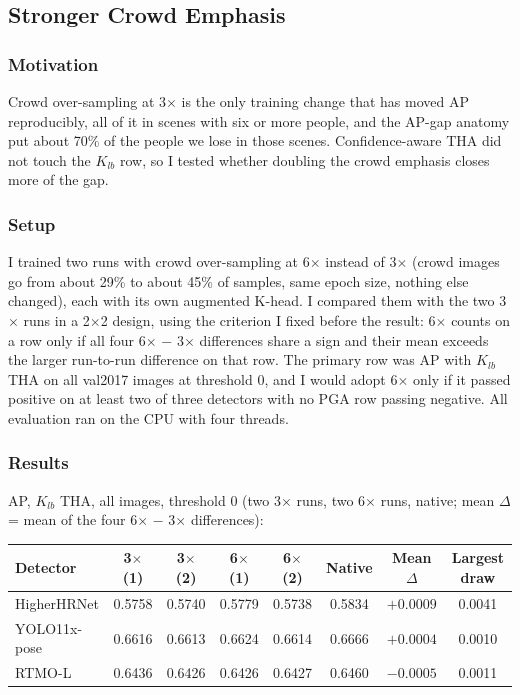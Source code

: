 \subsection{Stronger Crowd Emphasis}

\subsubsection{Motivation}

Crowd over-sampling at 3$\times$ is the only training change that has moved AP reproducibly, all of it in scenes with six or more people, and the AP-gap anatomy put about 70\% of the people we lose in those scenes.
Confidence-aware THA did not touch the $K_{lb}$ row, so I tested whether doubling the crowd emphasis closes more of the gap.

\subsubsection{Setup}

I trained two runs with crowd over-sampling at 6$\times$ instead of 3$\times$ (crowd images go from about 29\% to about 45\% of samples, same epoch size, nothing else changed), each with its own augmented K-head.
I compared them with the two 3$\times$ runs in a 2$\times$2 design, using the criterion I fixed before the result: 6$\times$ counts on a row only if all four 6$\times$ $-$ 3$\times$ differences share a sign and their mean exceeds the larger run-to-run difference on that row.
The primary row was AP with $K_{lb}$ THA on all val2017 images at threshold 0, and I would adopt 6$\times$ only if it passed positive on at least two of three detectors with no PGA row passing negative.
All evaluation ran on the CPU with four threads.

\subsubsection{Results}

AP, $K_{lb}$ THA, all images, threshold 0 (two 3$\times$ runs, two 6$\times$ runs, native; mean $\Delta$ = mean of the four 6$\times$ $-$ 3$\times$ differences):

{\small\setlength{\tabcolsep}{4pt}
\begin{tabular}{lccccccc}
\hline
\textbf{Detector} & \textbf{3$\times$ (1)} & \textbf{3$\times$ (2)} & \textbf{6$\times$ (1)} & \textbf{6$\times$ (2)} & \textbf{Native} & \textbf{Mean $\Delta$} & \textbf{Largest draw} \\
\hline
HigherHRNet  & 0.5758 & 0.5740 & 0.5779 & 0.5738 & 0.5834 & $+0.0009$ & 0.0041 \\
YOLO11x-pose & 0.6616 & 0.6613 & 0.6624 & 0.6614 & 0.6666 & $+0.0004$ & 0.0010 \\
RTMO-L       & 0.6436 & 0.6426 & 0.6426 & 0.6427 & 0.6460 & $-0.0005$ & 0.0011 \\
\hline
\end{tabular}
}

